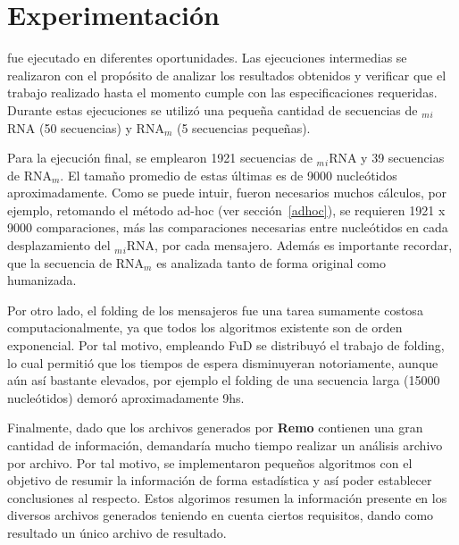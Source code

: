 \section{Experimentación}
\par {} fue ejecutado en diferentes oportunidades. Las ejecuciones intermedias se realizaron con el propósito de analizar los resultados obtenidos y verificar que el trabajo realizado hasta el momento cumple con las especificaciones requeridas. Durante estas ejecuciones se utilizó una pequeña cantidad de secuencias de $_m$$_i$RNA (50 secuencias) y RNA$_m$ (5 secuencias pequeñas).

\par Para la ejecución final, se emplearon 1921 secuencias de $_m$$_i$RNA y 39 secuencias de RNA$_m$. El tamaño promedio de estas últimas es de 9000 nucleótidos aproximadamente. Como se puede intuir, fueron necesarios muchos cálculos, por ejemplo, retomando el método ad-hoc (ver sección~\ref{adhoc}), se requieren 1921 x 9000 comparaciones, más las comparaciones necesarias entre nucleótidos en cada desplazamiento del $_m$$_i$RNA, por cada mensajero. Además es importante recordar, que la secuencia de RNA$_m$ es analizada tanto de forma original como humanizada. 

\par Por otro lado, el folding de los mensajeros fue una tarea sumamente costosa computacionalmente, ya que todos los algoritmos existente son de orden exponencial. Por tal motivo, empleando FuD se distribuyó el trabajo de folding, lo cual permitió que los tiempos de espera disminuyeran notoriamente, aunque aún así bastante elevados, por ejemplo el folding de una secuencia larga (15000 nucleótidos) demoró aproximadamente 9hs.

\par Finalmente, dado que los archivos generados por \textbf{Remo} contienen una gran cantidad de información, demandaría mucho tiempo realizar un análisis archivo por archivo. Por tal motivo, se implementaron pequeños algoritmos con el objetivo de resumir la información de forma estadística y así poder establecer conclusiones al respecto. Estos algorimos resumen la información presente en los diversos archivos generados teniendo en cuenta ciertos requisitos, dando como resultado un único archivo de resultado.
